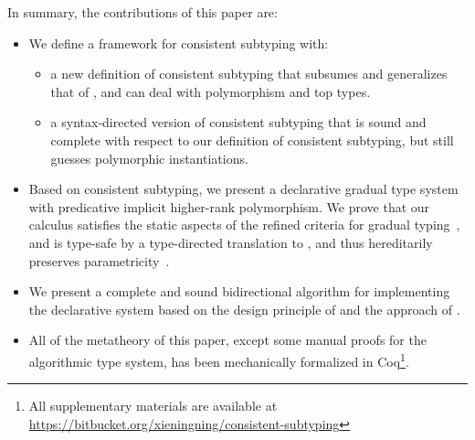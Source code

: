 In summary, the contributions of this paper are:
\begin{itemize}
\item We define a framework for consistent subtyping with:
  \begin{itemize}
  \item a new definition of consistent subtyping that subsumes and generalizes that
    of \citeauthor{siek2007gradual}, and can deal with polymorphism and top types.
  \item a syntax-directed version of consistent subtyping that is
    sound and complete with respect to our definition of consistent
    subtyping, but still guesses polymorphic instantiations.
  \end{itemize}
\item Based on consistent subtyping, we present a declarative gradual type
  system with predicative implicit higher-rank polymorphism. We prove that our calculus
  satisfies the static aspects of the refined criteria for gradual
  typing~\citep{siek2015refined}, and is type-safe by a type-directed
  translation to \pbc, and thus
  hereditarily preserves parametricity~\citep{amal2017blame}.
\item We present %
  a complete and sound bidirectional
  algorithm for
  implementing the declarative system based on the design principle of
  \citet{garcia2015principal} and the approach of \citet{dunfield2013complete}.
\item All of the metatheory of this paper, except some manual proofs for the
  algorithmic type system, has been mechanically formalized in Coq\footnote{All
    supplementary materials are available at \url{https://bitbucket.org/xieningning/consistent-subtyping}}.
\end{itemize}


